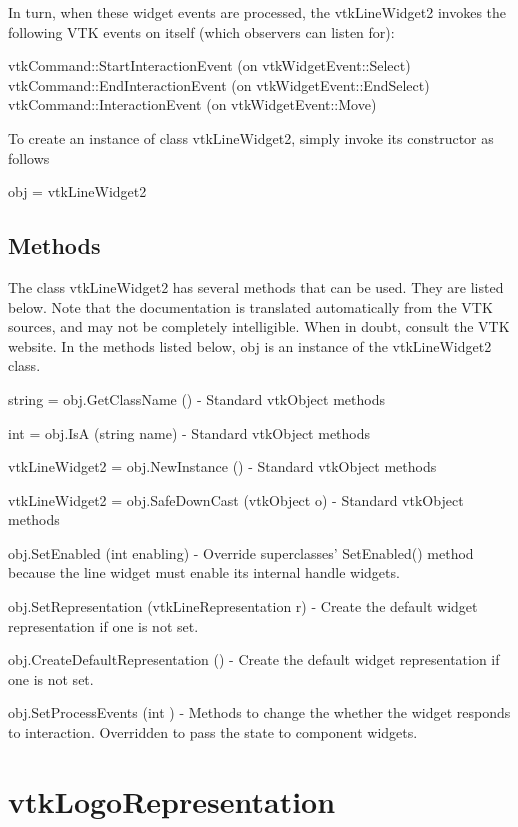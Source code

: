 In turn, when these widget events are processed, the vtk\-Line\-Widget2 invokes the following V\-T\-K events on itself (which observers can listen for)\-: 
\begin{DoxyPre}
   vtkCommand::StartInteractionEvent (on vtkWidgetEvent::Select)
   vtkCommand::EndInteractionEvent (on vtkWidgetEvent::EndSelect)
   vtkCommand::InteractionEvent (on vtkWidgetEvent::Move)
 \end{DoxyPre}


To create an instance of class vtk\-Line\-Widget2, simply invoke its constructor as follows \begin{DoxyVerb}  obj = vtkLineWidget2
\end{DoxyVerb}
 \hypertarget{vtkwidgets_vtkxyplotwidget_Methods}{}\subsection{Methods}\label{vtkwidgets_vtkxyplotwidget_Methods}
The class vtk\-Line\-Widget2 has several methods that can be used. They are listed below. Note that the documentation is translated automatically from the V\-T\-K sources, and may not be completely intelligible. When in doubt, consult the V\-T\-K website. In the methods listed below, {\ttfamily obj} is an instance of the vtk\-Line\-Widget2 class. 
\begin{DoxyItemize}
\item {\ttfamily string = obj.\-Get\-Class\-Name ()} -\/ Standard vtk\-Object methods  
\item {\ttfamily int = obj.\-Is\-A (string name)} -\/ Standard vtk\-Object methods  
\item {\ttfamily vtk\-Line\-Widget2 = obj.\-New\-Instance ()} -\/ Standard vtk\-Object methods  
\item {\ttfamily vtk\-Line\-Widget2 = obj.\-Safe\-Down\-Cast (vtk\-Object o)} -\/ Standard vtk\-Object methods  
\item {\ttfamily obj.\-Set\-Enabled (int enabling)} -\/ Override superclasses' Set\-Enabled() method because the line widget must enable its internal handle widgets.  
\item {\ttfamily obj.\-Set\-Representation (vtk\-Line\-Representation r)} -\/ Create the default widget representation if one is not set.  
\item {\ttfamily obj.\-Create\-Default\-Representation ()} -\/ Create the default widget representation if one is not set.  
\item {\ttfamily obj.\-Set\-Process\-Events (int )} -\/ Methods to change the whether the widget responds to interaction. Overridden to pass the state to component widgets.  
\end{DoxyItemize}\hypertarget{vtkwidgets_vtklogorepresentation}{}\section{vtk\-Logo\-Representation}\label{vtkwidgets_vtklogorepresentation}

